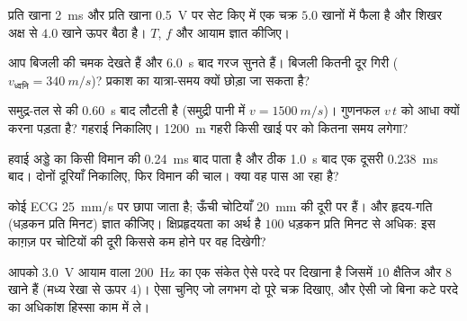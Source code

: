 \begin{exercise}[$\star$]\label{exo:g10:signals-and-waves:4}
प्रति खाना \qty{2}{ms} और प्रति खाना \qty{0.5}{V} पर सेट किए 
में एक चक्र $5.0$ खानों में फैला है और शिखर अक्ष से $4.0$ खाने ऊपर
बैठा है। $T$, $f$ और आयाम ज्ञात कीजिए।
\end{exercise}

\begin{exercise}[$\star$]\label{exo:g10:signals-and-waves:5}
आप बिजली की चमक देखते हैं और \qty{6.0}{s} बाद गरज सुनते हैं। बिजली कितनी दूर
गिरी ($v_{\text{ध्वनि}} = \qty{340}{m/s}$)? प्रकाश का यात्रा-समय क्यों छोड़ा जा सकता है?
\end{exercise}

\begin{exercise}[$\star\star$]\label{exo:g10:signals-and-waves:6}
समुद्र-तल से  की  \qty{0.60}{s} बाद लौटती है
(समुद्री पानी में $v = \qty{1500}{m/s}$)। गुणनफल $v\,t$ को आधा क्यों करना पड़ता है?
गहराई निकालिए। \qty{1200}{m} गहरी किसी खाई पर  को कितना
समय लगेगा?
\end{exercise}

\begin{exercise}[$\star\star$]\label{exo:g10:signals-and-waves:7}
हवाई अड्डे का  किसी विमान की  \qty{0.24}{ms} बाद
पाता है और ठीक \qty{1.0}{s} बाद एक दूसरी  \qty{0.238}{ms} बाद।
दोनों दूरियाँ निकालिए, फिर विमान की चाल। क्या वह पास आ रहा है?
\end{exercise}

\begin{exercise}[$\star\star$]\label{exo:g10:signals-and-waves:8}
कोई ECG \qty{25}{mm/s} पर छापा जाता है; ऊँची चोटियाँ \qty{20}{mm} की दूरी पर हैं।
 और हृदय-गति (धड़कन प्रति मिनट) ज्ञात कीजिए।
क्षिप्रहृदयता का अर्थ है $100$ धड़कन प्रति मिनट से अधिक: इस काग़ज़ पर
चोटियों की दूरी किससे कम होने पर वह दिखेगी?
\end{exercise}

\begin{exercise}[$\star\star$]\label{exo:g10:signals-and-waves:9}
आपको \qty{3.0}{V} आयाम वाला \qty{200}{Hz} का एक संकेत ऐसे परदे पर
दिखाना है जिसमें $10$ क्षैतिज और $8$  खाने हैं (मध्य
रेखा से ऊपर $4$)। ऐसा  चुनिए जो लगभग दो पूरे चक्र
दिखाए, और ऐसी  जो बिना कटे परदे का अधिकांश हिस्सा काम में
ले।
\end{exercise}


